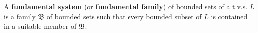A \textbf{fundamental system} (or \textbf{fundamental family}) of bounded sets of a t.v.s. $L$ is a family $\mathfrak{B}$ of bounded sets such that every bounded subset of $L$ is contained in a suitable member of $\mathfrak{B}$.
